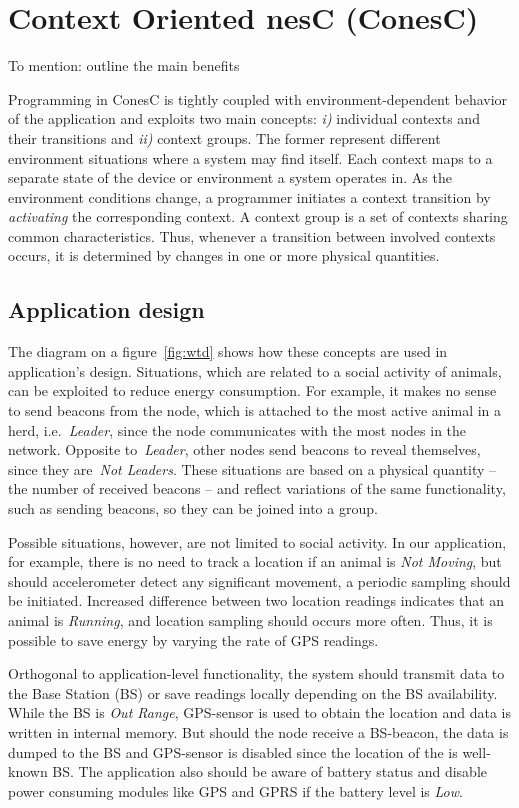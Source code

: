 \section{Context Oriented nesC (ConesC)} 

To mention: outline the main benefits

Programming in ConesC is tightly coupled with environment-dependent behavior of
the application and exploits two main concepts: \emph{i)} individual contexts
and their transitions and \emph{ii)} context groups. The former represent
different environment situations where a system may find itself. Each context
maps to a separate state of the device or environment a system operates in. As
the environment conditions change, a programmer initiates a context transition
by \emph{activating} the corresponding context. A context group is a set of contexts
sharing common characteristics. Thus, whenever a transition between involved
contexts occurs, it is determined by changes in one or more physical quantities.

\subsection{Application design}

The diagram on a figure~\ref{fig:wtd} shows how these concepts are used in application's design.
Situations, which are related to a social activity of animals, can be exploited
to reduce energy consumption. For example, it makes no sense to send beacons
from the node, which is attached to the most active animal in a herd, i.e.~\emph{Leader},
since the node communicates with the most nodes in the network. Opposite to~\emph{Leader},
other nodes send beacons to reveal themselves, since they are~\emph{Not Leaders}.
These situations are based on a physical quantity -- the number of
received beacons -- and reflect variations of the same functionality,
such as sending beacons, so they can be joined into a group.

Possible situations, however, are not limited to social activity. In our
application, for example, there is no need to
track a location if an animal is \emph{Not Moving}, but should accelerometer detect any
significant movement, a periodic sampling should be initiated. Increased
difference between two location readings indicates that an animal is
\emph{Running}, and location sampling should occurs more often. Thus, it
is possible to save energy by varying the rate of GPS readings.

Orthogonal to application-level functionality, the system should transmit data to
the Base Station (BS) or save readings locally depending on the BS
availability. While the BS is \emph{Out Range}, GPS-sensor is used to
obtain the location and data is written in internal memory. But should the node
receive a BS-beacon, the data is dumped to the BS and GPS-sensor is disabled
since the location of the is well-known BS. The application also should be aware
of battery status and disable power consuming modules like GPS and GPRS if the
battery level is \emph{Low}.

